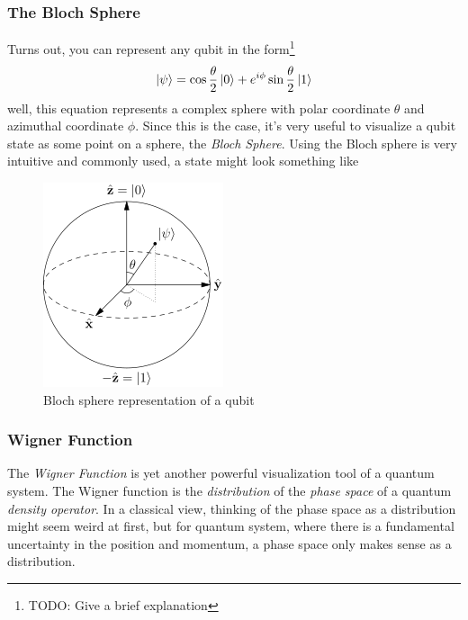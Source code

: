 \documentclass[english, a4paper, 12pt, twoside]{article}
\numberwithin{equation}{section} %
\begin{document}
\subsubsection{The Bloch Sphere}
Turns out, you can represent any qubit in the form\footnote{TODO: Give a brief explanation}
\[
    \ket{\psi} = \cos{\frac{\theta}{2}}\ket{0} + e^{i \phi} \sin{\frac{\theta}{2}}\ket{1}
\]
well, this equation represents a complex sphere with polar coordinate $\theta$ and azimuthal coordinate $\phi$. Since this is the case, it's very useful to visualize a qubit state as some point on a sphere, the \textit{Bloch Sphere}. Using the Bloch sphere is very intuitive and commonly used, a state might look something like
\begin{figure}[H]
    \centering
    \includegraphics[width=0.3\columnwidth]{Bloch.png}
    \caption{Bloch sphere representation of a qubit}
    \label{fig:Bloch-Sphere}
\end{figure}

\subsubsection{Wigner Function}
The \textit{Wigner Function} is yet another powerful visualization tool of a quantum system. The Wigner function is the \textit{distribution} of the \textit{phase space} of a quantum \textit{density operator}. In a classical view, thinking of the phase space as a distribution might seem weird at first, but for quantum system, where there is a fundamental uncertainty in the position and momentum, a phase space only makes sense as a distribution.
\end{document}
